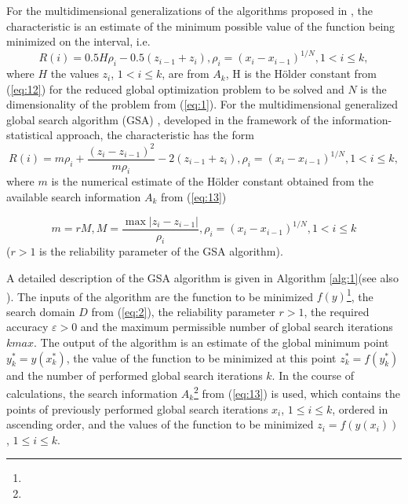 \documentclass[review]{elsarticle}
\begin{document}
For the multidimensional generalizations of the algorithms proposed in \cite{c34,c35}, the characteristic is an estimate of the minimum possible value of the function being minimized on the interval, i.e.
\begin{equation}\label{eq:17}
R(i)=0.5 H \rho_i - 0.5 (z_{i-1} + z_i), \rho_i=(x_i - x_{i-1})^{1/N}, 1 < i \leq k,
\end{equation}
where $H$ the values $z_i$, $1<i \leq k$, are from $A_k$, H is the H\"older constant from (\ref{eq:12}) for the reduced global optimization problem to be solved and $N$ is the dimensionality of the problem from (\ref{eq:1}). For the multidimensional generalized global search algorithm (GSA) \cite{c6,c23}, developed in the framework of the information-statistical approach, the characteristic has the form
\begin{equation}\label{eq:18}
R(i)=m \rho_i+\frac{(z_i-z_{i-1})^2}{m \rho_i }-2(z_{i-1}+z_i ), \rho_i=(x_i-x_{i-1})^{1/N}  ,1 < i \leq k,
\end{equation}
where $m$ is the numerical estimate of the H\"older constant obtained from the available search information $A_k$ from (\ref{eq:13})

\begin{equation}\label{eq:19}
m=r M, M=\frac{\max|z_i-z_{i-1}|}{\rho_i}, \rho_i=(x_i-x_{i-1})^{1/N}  ,1 < i \leq k
\end{equation}
($r>1$ is the reliability parameter of the GSA algorithm).

A detailed description of the GSA algorithm is given in Algorithm \ref{alg:1}(see also \cite{c6}). The inputs of the algorithm are the function to be minimized $f(y)$\footnote{ }, the search domain $D$ from (\ref{eq:2}), the reliability parameter $r > 1$, the required accuracy $\varepsilon > 0$ and the maximum permissible number of global search iterations $kmax$. The output of the algorithm is an estimate of the global minimum point $y_k^* =y(x_k^*)$, the value of the function to be minimized at this point $z_k^* =f(y_k^*)$  and the number of performed global search iterations $k$. In the course of calculations, the search information $A_k$\footnote{ } from (\ref{eq:13}) is used, which contains the points of previously performed global search iterations $x_i$, $1 \leq i \leq k$, ordered in ascending order, and the values of the function to be minimized $z_i=f(y(x_i))$, $1\leq i \leq k$.
\end{document}
